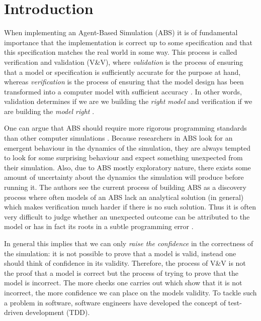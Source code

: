 \section{Introduction}
When implementing an Agent-Based Simulation (ABS) it is of fundamental importance that the implementation is correct up to some specification and that this specification matches the real world in some way. This process is called verification and validation (V\&V), where \textit{validation} is the process of ensuring that a model or specification is sufficiently accurate for the purpose at hand, whereas \textit{verification} is the process of ensuring that the model design has been transformed into a computer model with sufficient accuracy \cite{robinson_simulation:_2014}. In other words, validation determines if we are we building the \textit{right model} and verification if we are building the \textit{model right} \cite{balci_verification_1998}.

One can argue that ABS should require more rigorous programming standards than other computer simulations \cite{polhill_ghost_2005}. Because researchers in ABS look for an emergent behaviour in the dynamics of the simulation, they are always tempted to look for some surprising behaviour and expect something unexpected from their simulation. 
Also, due to ABS mostly exploratory nature, there exists some amount of uncertainty about the dynamics the simulation will produce before running it. The authors \cite{ormerod_validation_2006} see the current process of building ABS as a discovery process where often models of an ABS lack an analytical solution (in general) which makes verification much harder if there is no such solution. Thus it is often very difficult to judge whether an unexpected outcome can be attributed to the model or has in fact its roots in a subtle programming error \cite{galan_errors_2009}.

In general this implies that we can only \textit{raise the confidence} in the correctness of the simulation: it is not possible to prove that a model is valid, instead one should think of confidence in its validity. Therefore, the process of V\&V is not the proof that a model is correct but the process of trying to prove that the model is incorrect. The more checks one carries out which show that it is not incorrect, the more confidence we can place on the models validity. To tackle such a problem in software, software engineers have developed the concept of test-driven development (TDD).

